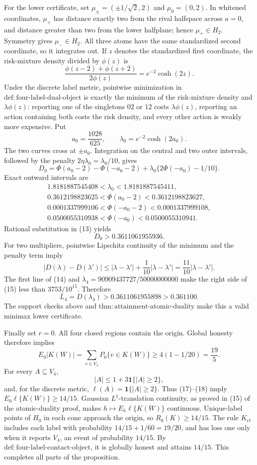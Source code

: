 For the lower certificate, set
\(\mu_\pm=(\pm1/\sqrt2,2)\) and \(\mu_0=(0,2)\).
In whitened coordinates, \(\mu_+\) has distance exactly two from the rival
halfspace across \(a=0\), and distance greater than two from the lower
halfplane; hence \(\mu_+\in H_2\).  Symmetry gives \(\mu_-\in H_2\).
All three atoms have the same standardized second coordinate, so it
integrates out.  If \(z\) denotes the standardized first coordinate, the
risk-mixture density divided by \(\phi(z)\) is
\[
 \frac{\phi(z-2)+\phi(z+2)}{2\phi(z)}
 =e^{-2}\cosh(2z).
\tag{11}
\]
Under the discrete label metric, pointwise minimization in
\(\mathrm{def:four\mbox{-}label\mbox{-}dual\mbox{-}object}\) is exactly the
minimum of the risk-mixture density and \(\lambda\phi(z)\): reporting one
of the singletons \(02\) or \(12\) costs \(\lambda\phi(z)\), reporting an
action containing both costs the risk density, and every other action is
weakly more expensive.  Put
\[
 a_0=\frac{1028}{625},\qquad
 \lambda_0=e^{-2}\cosh(2a_0).
\tag{12}
\]
The two curves cross at \(\pm a_0\).  Integration on the central and two
outer intervals, followed by the penalty
\(2\eta\lambda_0=\lambda_0/10\), gives
\[
 D_0=
 \Phi(a_0-2)-\Phi(-a_0-2)
 +\lambda_0\{2\Phi(-a_0)-1/10\}.
\tag{13}
\]
Exact outward intervals are
\[
 \begin{gathered}
 1.8181887545408<\lambda_0<1.8181887545411,\\
 0.3612198823625<\Phi(a_0-2)<0.3612198823627,\\
 0.0001337999106<\Phi(-a_0-2)<0.0001337999108,\\
 0.0500055310938<\Phi(-a_0)<0.0500055310941.
 \end{gathered}
\tag{14}
\]
Rational substitution in (13) yields
\[
 D_0>0.3611061955936.
\]
For two multipliers, pointwise Lipschitz continuity of the minimum and the
penalty term imply
\[
 |D(\lambda)-D(\lambda')|
 \leq |\lambda-\lambda'|+\frac1{10}|\lambda-\lambda'|
 =\frac{11}{10}|\lambda-\lambda'|.
\tag{15}
\]
The first line of (14) and
\(\lambda_4=90909437727/50000000000\) make the right side of (15) less
than \(3753/10^{15}\).  Therefore
\[
 L_4=D(\lambda_4)>0.3611061955898>0.361100.
\tag{16}
\]
The support checks above and
\(\mathrm{thm:attainment\mbox{-}atomic\mbox{-}duality}\) make this a valid
minimax lower certificate.

Finally set \(r=0\).  All four closed regions contain the origin.  Global
honesty therefore implies
\[
 E_0|K(W)|=\sum_{v\in V_4}P_0\{v\in K(W)\}
 \geq4(1-1/20)=\frac{19}{5}.
\tag{17}
\]
For every \(A\subseteq V_4\),
\[
 |A|\leq1+3\mathbf1\{|A|\geq2\},
\tag{18}
\]
and, for the discrete metric, \(\ell(A)=\mathbf1\{|A|\geq2\}\).
Thus (17)--(18) imply
\(E_0\ell\{K(W)\}\geq14/15\).  Gaussian \(L^1\)-translation continuity,
as proved in (15) of the atomic-duality proof, makes
\(h\mapsto E_h\ell\{K(W)\}\) continuous.  Unique-label points of \(H_0\)
in each cone approach the origin, so \(R_0(K)\geq14/15\).
The rule \(K_{\mathrm{ct}}\) includes each label with probability
\(14/15+1/60=19/20\), and has loss one only when it reports \(V_4\), an
event of probability \(14/15\).  By
\(\mathrm{def:four\mbox{-}label\mbox{-}contact\mbox{-}object}\), it is
globally honest and attains \(14/15\).  This completes all parts of the
proposition.

